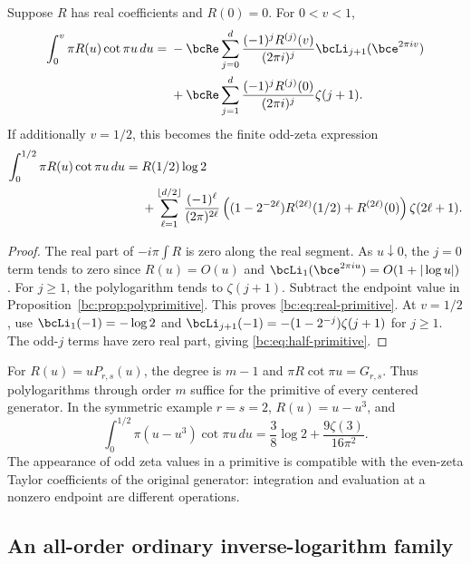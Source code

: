 \begin{corollary}
\label{bc:cor:real-primitive}
Suppose $R$ has real coefficients and $R(0)=0$. For $0<v<1$,
\begin{align}
 \int_0^v\pi R(u)\cot\pi u\,du
 ={}&-\bcRe\sum_{j=0}^{d}
       \frac{(-1)^jR^{(j)}(v)}{(2\pi i)^j}
                           \bcLi_{j+1}(\bce^{2\pi i v})\notag\\
 &+\bcRe\sum_{j=1}^{d}
       \frac{(-1)^jR^{(j)}(0)}{(2\pi i)^j}\zeta(j+1).
 \label{bc:eq:real-primitive}
\end{align}
If additionally $v=1/2$, this becomes the finite odd-zeta expression
\begin{align}
 \int_0^{1/2}\pi R(u)\cot\pi u\,du
 ={}&R(1/2)\log2\notag\\
 &+\sum_{\ell=1}^{\lfloor d/2\rfloor}
   \frac{(-1)^\ell}{(2\pi)^{2\ell}}
   \left((1-2^{-2\ell})R^{(2\ell)}(1/2)+R^{(2\ell)}(0)\right)
                           \zeta(2\ell+1).
 \label{bc:eq:half-primitive}
\end{align}
\end{corollary}
\begin{proof}
The real part of $-i\pi\int R$ is zero along the real segment. As
$u\downarrow0$, the $j=0$ term tends to zero since
$R(u)=O(u)$ and $\bcLi_1(\bce^{2\pi i u})=O(1+|\log u|)$.
For $j\ge1$, the polylogarithm tends to $\zeta(j+1)$. Subtract the
endpoint value in Proposition~\ref{bc:prop:polyprimitive}. This proves
\eqref{bc:eq:real-primitive}. At $v=1/2$, use
$\bcLi_1(-1)=-\log2$ and
$\bcLi_{j+1}(-1)=-(1-2^{-j})\zeta(j+1)$ for $j\ge1$.
The odd-$j$ terms have zero real part, giving
\eqref{bc:eq:half-primitive}.
\end{proof}

For $R(u)=uP_{r,s}(u)$, the degree is $m-1$ and
$\pi R\cot\pi u=G_{r,s}$. Thus polylogarithms through order $m$ suffice
for the primitive of every centered generator. In the symmetric example
$r=s=2$, $R(u)=u-u^3$, and
\begin{equation}\label{bc:eq:primitive-22}
 \int_0^{1/2}\pi(u-u^3)\cot\pi u\,du
      =\frac38\log2+\frac{9\zeta(3)}{16\pi^2}.
\end{equation}
The appearance of odd zeta values in a primitive is compatible with the
even-zeta Taylor coefficients of the original generator: integration
and evaluation at a nonzero endpoint are different operations.

\subsection{An all-order ordinary inverse-logarithm family}

